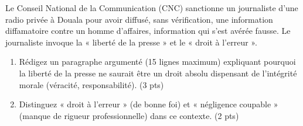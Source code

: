 \documentclass[11pt]{article}
\begin{document}
\begin{exercice}
Le Conseil National de la Communication (CNC) sanctionne un journaliste d'une radio privée à Douala pour avoir diffusé, sans vérification, une information diffamatoire contre un homme d'affaires, information qui s'est avérée fausse. Le journaliste invoque la « liberté de la presse » et le « droit à l'erreur ».
\begin{enumerate}
    \item Rédigez un paragraphe argumenté (15 lignes maximum) expliquant pourquoi la liberté de la presse ne saurait être un droit absolu dispensant de l'intégrité morale (véracité, responsabilité). (3 pts)
    \item Distinguez « droit à l'erreur » (de bonne foi) et « négligence coupable » (manque de rigueur professionnelle) dans ce contexte. (2 pts)
\end{enumerate}
\end{exercice}
\end{document}
